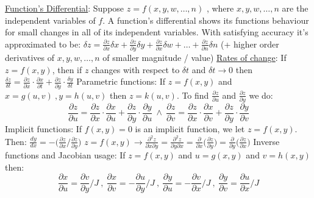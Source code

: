 \documentclass[12pt]{article}
\begin{document}
\begin{flushleft}
	\textbullet \quad \uline{Function's Differential}: Suppose $\displaystyle z=f(x,y,w,\ldots , n)$ , where $x,y,w, \ldots, n$ are the independent variables of $f$. A function's differential shows its functions behaviour for small changes in all of its independent variables. With satisfying accuracy it's approximated to be: \linebreak 
	$\displaystyle \delta z = \frac{\partial z}{\partial x} \delta x + \frac{\partial z}{\partial y} \delta y + \frac{\partial z}{\partial x} \delta w + \ldots + \frac{\partial z}{\partial n} \delta n $ (+ higher order derivatives of $x,y,w,\ldots , n$ of smaller magnitude / value) \linebreak 
	\textbullet \quad \uline{Rates of change}: If $z = f(x,y)$, then if $z$ changes with respect to $\delta t$ and $\delta t \rightarrow 0$ then \linebreak 
	$\displaystyle \frac{\delta z}{\delta t} = \frac{\partial z}{\partial x} \cdot \frac{\partial x}{\partial t} + \frac{\partial z}{\partial y} \cdot \frac{\delta y}{\delta t} $ \linebreak 
	\textbullet \quad Parametric functions: If $z=f(x,y)$ and $x=g(u,v) \ , y=h(u,v)$ then $z=k(u,v)$. To find $\displaystyle \frac{\partial z}{\partial u}$ and $\frac{\partial z}{\partial y}$ we do: \linebreak 
	$$ \frac{\partial z}{\partial u} = \frac{\partial z}{\partial x} \cdot \frac{\partial x}{\partial u} + \frac{\partial z}{\partial y} \cdot \frac{\partial y}{\partial u} \ \land \ \frac{\partial z}{\partial v} = \frac{\partial z}{\partial x} \cdot \frac{\partial x}{\partial	v} + \frac{\partial z}{\partial y} \cdot \frac{\partial y}{\partial v} $$ 
	\textbullet \quad Implicit functions: If $f(x,y) = 0$ is an implicit function, we let $z=f(x,y)$. Then: $\displaystyle  \frac{dy}{dx} = - \big( \frac{\partial z}{\partial x} / \frac{\partial z}{\partial y} \big) $ \linebreak 
	\textbullet \quad $\displaystyle z= f(x,y) \rightarrow \frac{\partial^2 z}{\partial x \partial y} = \frac{\partial^2 z}{\partial y \partial x} = \frac{\partial}{\partial x} \big( \frac{\partial z}{\partial y} \big) = \frac{\partial}{\partial y} \big( \frac{\partial z}{\partial x} \big) $ \linebreak 
	\textbullet \quad Inverse functions and Jacobian usage: \linebreak 
	If $z=f(x,y)$ and $u=g(x,y)$ and $v=h(x,y)$ then: \linebreak 
	$$ \frac{\partial x}{\partial u} = \frac{\partial v}{\partial y} / J \ , \ \frac{\partial x}{\partial v} = - \frac{\partial u}{\partial y} / J \ , \ \frac{\partial y}{\partial u} = - \frac{\partial v}{\partial x} / J \ , \ \frac{\partial y}{\partial v} = \frac{\partial u}{\partial x} / J $$ 

\end{flushleft}
\end{document}
